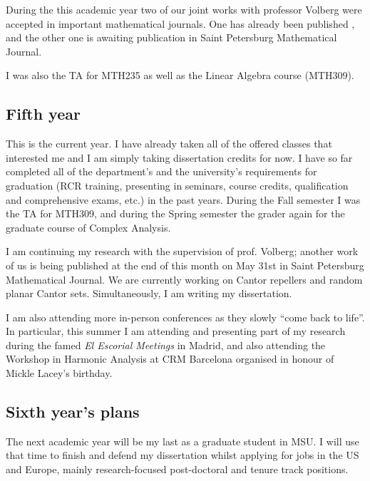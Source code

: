 \documentclass[11pt]{amsart} %
\begin{document}
During the this academic year two of our joint works with professor Volberg were accepted in important mathematical journals. One has already been published \cite{VarVol2021_note}, and the other one \cite{VarVol2019} is awaiting publication in Saint Petersburg Mathematical Journal.

I was also the TA for MTH235 as well as the Linear Algebra course (MTH309).


\subsection*{Fifth year} This is the current year. I have already taken all of the offered classes that interested me and I am simply taking dissertation credits for now. I have so far completed all of the department's and the university's requirements for graduation (RCR training, presenting in seminars, course credits, qualification and comprehensive exams, etc.) in the past years. During the Fall semester I was the TA for MTH309, and during the Spring semester the grader again for the graduate course of Complex Analysis.

I am continuing my research with the supervision of prof. Volberg; another work of us \cite{VarVol2022v2} is being published at the end of this month on May 31st in Saint Petersburg Mathematical Journal. We are currently working on Cantor repellers and random planar Cantor sets. Simultaneously, I am writing my dissertation.

I am also attending more in-person conferences as they slowly \enquote{come back to life}. In particular, this summer I am attending and presenting part of my research during the famed \emph{El Escorial Meetings} in Madrid, and also attending the Workshop in Harmonic Analysis at CRM Barcelona organised in honour of Mickle Lacey's birthday.


\subsection*{Sixth year's plans} The next academic year will be my last as a graduate student in MSU. I will use that time to finish and defend my dissertation whilst applying for jobs in the US and Europe, mainly research-focused post-doctoral and tenure track positions.
\end{document}
